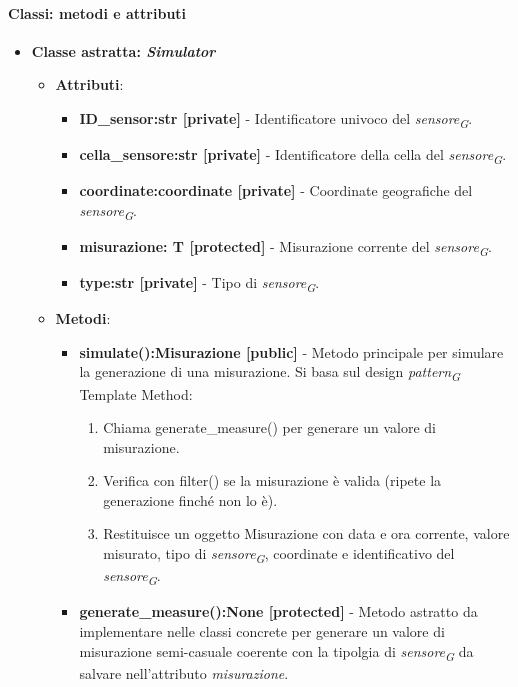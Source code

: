 \paragraph{Classi: metodi e attributi}
\begin{itemize}
    \item {\textbf{Classe astratta: \textit{Simulator}}}
        \begin{itemize}
            \item \textbf{Attributi}: 
            \begin{itemize}
                \item \textbf{ID\_sensor:str [private]} - Identificatore univoco del \textit{sensore}\textsubscript{\textit{G}}.
                \item \textbf{cella\_sensore:str [private]} - Identificatore della cella del \textit{sensore}\textsubscript{\textit{G}}.
                \item \textbf{coordinate:coordinate [private]} - Coordinate geografiche del \textit{sensore}\textsubscript{\textit{G}}.
                \item \textbf{misurazione: T [protected]} - Misurazione corrente del \textit{sensore}\textsubscript{\textit{G}}.
                \item \textbf{type:str [private]} - Tipo di \textit{sensore}\textsubscript{\textit{G}}.
            \end{itemize}
            \item \textbf{Metodi}:
            \begin{itemize}
                \item \textbf{simulate():Misurazione [public]} - Metodo principale per simulare la generazione di una misurazione.
                Si basa sul design \textit{pattern}\textsubscript{\textit{G}} Template Method:
                \begin{enumerate}
                    \item     Chiama generate\_measure() per generare un valore di misurazione.
                    \item     Verifica con filter() se la misurazione è valida (ripete la generazione finché non lo è).
                    \item     Restituisce un oggetto Misurazione con data e ora corrente, valore misurato, tipo di \textit{sensore}\textsubscript{\textit{G}}, coordinate e identificativo del \textit{sensore}\textsubscript{\textit{G}}.
                \end{enumerate}
                \item \textbf{generate\_measure():None [protected]} - Metodo astratto da implementare nelle classi concrete per generare un valore di misurazione semi-casuale coerente con la tipolgia di \textit{sensore}\textsubscript{\textit{G}} da salvare nell'attributo \textit{misurazione}.

\end{itemize}
\end{itemize}
\end{itemize}
